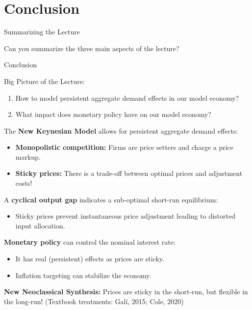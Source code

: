 \documentclass[10pt,c,aspectratio=1610,handout]{beamer}
\begin{document}
\section{Conclusion}%
\begin{frame}{Summarizing the Lecture}%
  \begin{center}%
    \begin{large}%
      Can you summarize the three main aspects of the lecture?%
    \end{large}%
  \end{center}%
\end{frame}%
\begin{frame}{Conclusion}%
  \begin{block}{Big Picture of the Lecture:}%
    \begin{enumerate}%
      \item How to model persistent aggregate demand effects in our model economy?%
      \item What impact does monetary policy have on our model economy?%
    \end{enumerate}%
  \end{block}%
  \pause%
  The \textbf{New Keynesian Model} allows for persistent aggregate demand effects:%
  \begin{itemize}%
    \item[$\blacktriangleright$] \textbf{Monopolistic competition:} Firms are price setters and charge a price markup.%
    \item[$\blacktriangleright$] \textbf{Sticky prices:} There is a trade-off between optimal prices and adjustment costs!%
  \end{itemize}%
  \pause%
  A \textbf{cyclical output gap} indicates a sub-optimal short-run equilibrium:%
  \begin{itemize}%
    \item[$\blacktriangleright$] Sticky prices prevent instantaneous price adjustment leading to distorted input allocation.%
  \end{itemize}%
  \pause%
  \textbf{Monetary policy} can control the nominal interest rate:%
  \begin{itemize}%
    \item[$\blacktriangleright$] It has real (persistent) effects as prices are sticky.%
    \item[$\blacktriangleright$] Inflation targeting can stabilize the economy.%
  \end{itemize}%
  \pause%
  \textbf{New Neoclassical Synthesis:} Prices are sticky in the short-run, but flexible in the long-run!{\scriptsize{} (Textbook treatments: Gal\'i, 2015; Cole, 2020)}%
\end{frame}%
\end{document}
